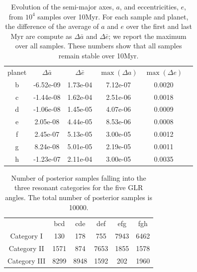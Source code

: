 \documentclass[twocolumn]{aastex63}
\begin{document}
\begin{table}
    \centering
    \begin{tabular}{|c|c c c c c}
        planet & $\Delta \bar{a}$ & $\Delta \bar{e}$ & $\max (\Delta a)$ & $\max(\Delta e)$ & \\
        b      & -6.52e-09        & 1.73e-04         & 7.12e-07          & 0.0020             \\
        c      & -1.44e-08        & 1.62e-04         & 2.51e-06          & 0.0018             \\
        d      & -1.06e-08        & 1.45e-05         & 4.07e-06          & 0.0009             \\
        e      & 2.05e-08         & 4.44e-05         & 8.53e-06          & 0.0008             \\
        f      & 2.45e-07         & 5.13e-05         & 3.00e-05          & 0.0012             \\
        g      & 8.24e-08         & 5.01e-05         & 2.19e-05          & 0.0011             \\
        h      & -1.23e-07        & 2.11e-04         & 3.00e-05          & 0.0035
    \end{tabular}
    \caption{Evolution of the semi-major axes, $a$, and eccentricities, $e$, from $10^4$ samples over 10Myr. For each sample and planet, the difference of the average of $a$ and $e$ over the first and last Myr are compute as $\Delta \bar{a}$ and  $\Delta \bar{e}$; we report the maximum over all samples. These numbers show that all samples remain stable over 10Myr.}
    \label{tab:averageAE}
\end{table}


\begin{table}
    \centering
    \begin{tabular}{|c|c c c c c}
                     & bcd  & cde  & def  & efg  & fgh  \\
        Category I   & 130  & 178  & 755  & 7943 & 6462 \\
        Category II  & 1571 & 874  & 7653 & 1855 & 1578 \\
        Category III & 8299 & 8948 & 1592 & 202  & 1960
    \end{tabular}
    \caption{Number of posterior samples falling into the three resonant categories for the five GLR angles. The total number of posterior samples is 10000.}
    \label{tab:cat}
\end{table}



\end{document}
